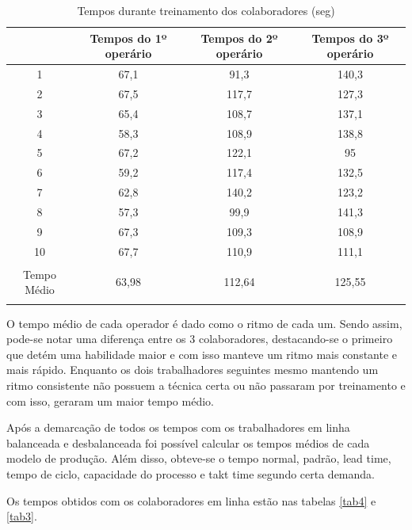 \documentclass[
	12pt,				%
	oneside,			%
	a4paper,			%
	english,			%
	french,				%
	spanish,			%
	brazil,				%
	]{abntex2}
\begin{document}
\begin{table}[H]
\centering
\caption{Tempos durante treinamento dos colaboradores (seg)}
\begin{tabular}{c|c|c|c}

&Tempos do 1º operário	&		Tempos do 2º operário	&		Tempos do 3º operário		\\ \hline
1&	67,1	&		91,3	&		140,3			\\ \hline
2&	67,5	&		117,7		&	127,3			\\ \hline
3&	65,4	&		108,7		&	137,1			\\ \hline
4&	58,3	&		108,9		&	138,8			\\ \hline
5&	67,2	&		122,1		&	95			\\ \hline
6&	59,2	&		117,4		&	132,5			\\ \hline
7&	62,8	&		140,2		&	123,2			\\ \hline
8&	57,3	&		99,9		&	141,3			\\ \hline
9&	67,3	&		109,3		&	108,9			\\ \hline
10	&67,7	&		110,9		&	111,1			\\ \hline
Tempo Médio&	63,98	&		112,64	&		125,55		
	
\label{tab1}
\end{tabular}	
\end{table}
								
O tempo médio de cada operador é dado como o ritmo de cada um. Sendo assim, pode-se notar uma diferença entre os 3 colaboradores, destacando-se o primeiro que detém uma habilidade maior e com isso manteve um ritmo mais constante e mais rápido. Enquanto os dois trabalhadores seguintes mesmo mantendo um ritmo consistente não possuem a técnica certa ou não passaram por treinamento e com isso, geraram um maior tempo médio.

Após a demarcação de todos os tempos com os trabalhadores em linha balanceada e desbalanceada foi possível calcular os tempos médios de cada modelo de produção. Além disso, obteve-se o tempo normal, padrão, lead time, tempo de ciclo, capacidade do processo e takt time segundo certa demanda.

Os tempos obtidos com os colaboradores em linha estão nas tabelas \ref{tab4} e \ref{tab3}.
\end{document}
